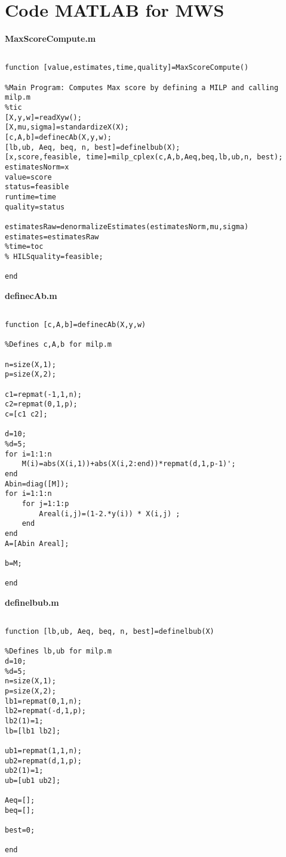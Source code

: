 \documentclass[12pt]{article}
\begin{document}
\section{Code MATLAB for MWS} \label{Sec:Contents}

\textbf{MaxScoreCompute.m}

\begin{lstlisting}

function [value,estimates,time,quality]=MaxScoreCompute()

%Main Program: Computes Max score by defining a MILP and calling milp.m
%tic
[X,y,w]=readXyw();
[X,mu,sigma]=standardizeX(X);
[c,A,b]=definecAb(X,y,w);
[lb,ub, Aeq, beq, n, best]=definelbub(X);
[x,score,feasible, time]=milp_cplex(c,A,b,Aeq,beq,lb,ub,n, best);
estimatesNorm=x
value=score
status=feasible
runtime=time
quality=status

estimatesRaw=denormalizeEstimates(estimatesNorm,mu,sigma)
estimates=estimatesRaw
%time=toc
% HILSquality=feasible;

end

\end{lstlisting}


\textbf{definecAb.m}

\begin{lstlisting}

function [c,A,b]=definecAb(X,y,w)

%Defines c,A,b for milp.m

n=size(X,1);
p=size(X,2);

c1=repmat(-1,1,n);
c2=repmat(0,1,p);
c=[c1 c2];

d=10;
%d=5;
for i=1:1:n
    M(i)=abs(X(i,1))+abs(X(i,2:end))*repmat(d,1,p-1)';
end
Abin=diag([M]);
for i=1:1:n
    for j=1:1:p
        Areal(i,j)=(1-2.*y(i)) * X(i,j) ;
    end
end
A=[Abin Areal];

b=M;

end

\end{lstlisting}



\textbf{definelbub.m}

\begin{lstlisting}

function [lb,ub, Aeq, beq, n, best]=definelbub(X)

%Defines lb,ub for milp.m
d=10;
%d=5;
n=size(X,1);
p=size(X,2);
lb1=repmat(0,1,n);
lb2=repmat(-d,1,p);
lb2(1)=1;
lb=[lb1 lb2];

ub1=repmat(1,1,n);
ub2=repmat(d,1,p);
ub2(1)=1;
ub=[ub1 ub2];

Aeq=[];
beq=[];

best=0;

end

\end{lstlisting}
\end{document}
